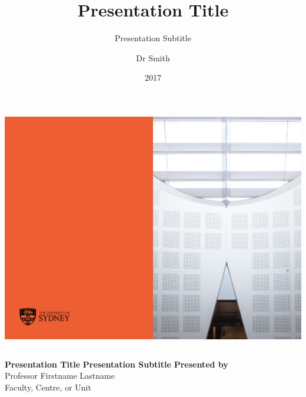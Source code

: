 \documentclass{beamer}
\title{Presentation Title}
\subtitle{Presentation Subtitle} %
\author{Dr Smith}
\institute{University of Sydney}
\date{2017}
\begin{document}

{\includegraphics[width=\paperwidth,height=\paperheight]{titlebgstd2jun16.pdf}}

\begin{frame}
\vspace{2cm}
\begin{columns}
\column{5.5cm}
{\bf{\color{usydwhite}Presentation Title}}	%
\vspace{1cm}
{\bf Presentation Subtitle}					%
{\bf Presented by} \\
Professor Firstname Lastname \\				%
Faculty, Centre, or Unit					%

\column{6cm}
\end{columns}
\end{frame}

\end{document}
